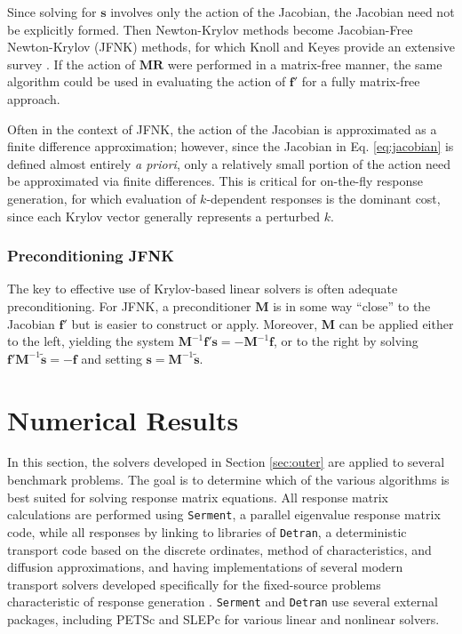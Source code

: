 Since solving for $\mathbf{s}$ involves only the action of the 
Jacobian, the Jacobian need not be explicitly formed.  Then 
Newton-Krylov methods become  Jacobian-Free Newton-Krylov (JFNK) 
methods, for which Knoll and Keyes provide an extensive survey 
\cite{knoll2004jfn}.  If the action of $\mathbf{MR}$ were performed 
in a matrix-free 
manner, the same algorithm could be used in evaluating the 
action of $\mathbf{f}'$ for a fully matrix-free approach.

Often in the context of JFNK, the action 
of the Jacobian is approximated as a finite difference 
approximation; however, since the Jacobian in Eq. \ref{eq:jacobian} 
is defined almost entirely {\it a priori}, only a relatively small 
portion of the action need be approximated via finite differences.  
This is critical for on-the-fly response generation, for which
evaluation of $k$-dependent responses is the dominant cost, since
each Krylov vector generally represents a perturbed $k$.

\subsubsection{Preconditioning JFNK}

The key to effective use of Krylov-based linear solvers is often 
adequate preconditioning.  For JFNK, a preconditioner $\mathbf{M}$ is 
in some way ``close'' to the Jacobian $\mathbf{f}'$ but is easier to 
construct or apply.  Moreover, $\mathbf{M}$ can be applied either 
to the left, yielding the 
system $\mathbf{M}^{-1}\mathbf{f}'\mathbf{s}=-\mathbf{M}^{-1}\mathbf{f}$, or 
to the right by solving 
$\mathbf{f}' \mathbf{M}^{-1} \tilde{\mathbf{s}} = -\mathbf{f}$ and 
setting $\mathbf{s} =  \mathbf{M}^{-1} \tilde{\mathbf{s}} $.

\section{Numerical Results}
\label{sec:results}


In this section, the solvers developed in 
Section \ref{sec:outer} are applied to several benchmark
problems.  The goal is to determine
which of the various algorithms is best suited for solving 
response matrix equations.  All response matrix calculations are performed 
using {\tt Serment}, a parallel eigenvalue response matrix code,
while all responses by linking to libraries of {\tt Detran}, a deterministic 
transport code based on the discrete ordinates, method of characteristics, 
and diffusion approximations, and having implementations of 
several modern transport solvers developed specifically 
for the fixed-source problems characteristic of 
response generation \cite{roberts2014dpm}.  {\tt Serment} 
and {\tt Detran} use several external packages, including 
PETSc \cite{petsc} and SLEPc \cite{slepc} for various linear 
and nonlinear solvers.

